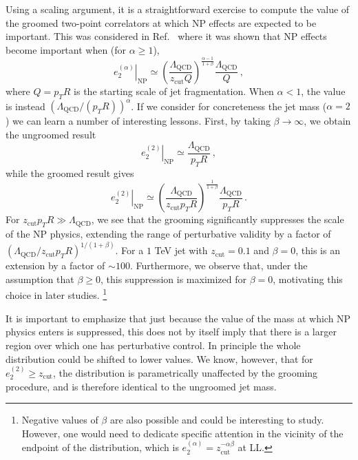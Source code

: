 \documentclass[11pt]{cernrep}
\begin{document}
Using a scaling argument, it is a straightforward exercise to compute the value of the groomed two-point correlators at which NP effects are expected to be important.
%
This was considered in Ref.~\cite{Dasgupta:2013ihk,Frye:2016aiz} where it was shown that NP effects become important when (for $\alpha \geq 1$),
%
\begin{equation}
\label{jetsub_alphas_eq:np}
\left. e_2^{(\alpha)}\right |_{\mathrm{NP}} \simeq  \left( \frac{\Lambda_{\mathrm{QCD}}}{z_{\mathrm{cut}}  Q}  \right)^{\frac{\alpha-1}{1+\beta}}  \frac{\Lambda_{\mathrm{QCD}}}{Q}\,,
\end{equation}
%
where $Q=p_TR$ is the starting scale of jet fragmentation.
%
When $\alpha< 1$, the value is instead $(\Lambda_{\mathrm{QCD}}/(p_TR))^\alpha$.
%
If we consider for concreteness the jet mass ($\alpha=2$) we can learn a number of interesting lessons.
%
First, by taking $\beta\to \infty$, we obtain the ungroomed result
%
\begin{equation}
\left. e_2^{(2)} \right |_{\mathrm{NP}} \simeq  \frac{\Lambda_{\mathrm{QCD}}}{p_TR}\,,
\end{equation} 
%
while the groomed result gives 
%
\begin{equation}
\left. e_2^{(2)} \right |_{\mathrm{NP}} \simeq  \left( \frac{\Lambda_{\mathrm{QCD}}}{z_{\mathrm{cut}}  p_TR}  \right)^{\frac{1}{1+\beta}}  \frac{\Lambda_{\mathrm{QCD}}}{p_TR}\,.
\end{equation}
%
For $z_{\mathrm{cut}}  p_T R \gg \Lambda_{\mathrm{QCD}}$, we see that the grooming significantly suppresses the scale of the NP physics, extending the range of perturbative validity by a factor of $({\Lambda_{\mathrm{QCD}}} / {z_{\mathrm{cut}}  p_TR})^{1/(1+\beta)}$.
%
For a $1$ TeV jet with $z_{\mathrm{cut}}  =0.1$ and $\beta=0$, this is an extension by a factor of $\sim 100$.
%
Furthermore, we observe that, under the assumption that $\beta \geq 0$, this suppression is maximized for $\beta=0$, motivating this choice in later studies.%
\footnote{Negative values of $\beta$ are also possible and could be interesting to study.  However, one would need to dedicate specific attention in the vicinity of the endpoint of the distribution, which is $e_2^{(\alpha)}=z_{\mathrm{cut}}^{-\alpha\beta}$ at LL.}

%
It is important to emphasize that just because the value of the mass at which NP physics enters is suppressed, this does not by itself imply that there is a larger region over which one has perturbative control.
%
In principle the whole distribution could be shifted to lower values.
%
We know, however, that for $e_2^{(2)}\geq z_{\mathrm{cut}} $, the distribution is parametrically unaffected by the grooming procedure, and is therefore identical to the ungroomed jet mass. 
\end{document}

